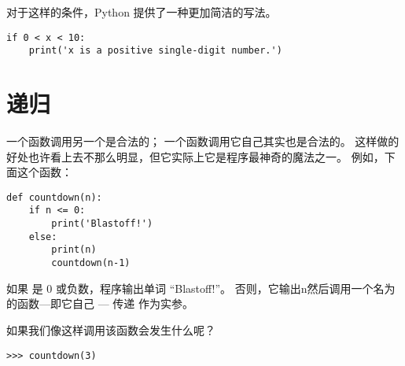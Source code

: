 {{{{%

对于这样的条件，Python 提供了一种更加简洁的写法。

\begin{lstlisting}
if 0 < x < 10:
    print('x is a positive single-digit number.')
\end{lstlisting}


\section{递归}
\label{recursion}
  


一个函数调用另一个是合法的； 一个函数调用它自己其实也是合法的。
这样做的好处也许看上去不那么明显，但它实际上它是程序最神奇的魔法之一。
例如，下面这个函数：

\begin{lstlisting}
def countdown(n):
    if n <= 0:
        print('Blastoff!')
    else:
        print(n)
        countdown(n-1)
\end{lstlisting}

%

如果  是 0 或负数，程序输出单词 ``Blastoff!''。
否则，它输出n然后调用一个名为  的函数—即它自己 --- 传递  作为实参。


如果我们像这样调用该函数会发生什么呢？


\begin{lstlisting}
>>> countdown(3)
\end{lstlisting}

}}}}
